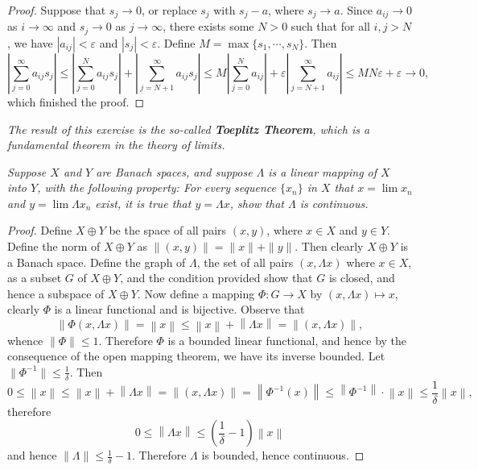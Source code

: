 \begin{proof}
Suppose that $s_j\to 0$, or replace $s_j$ with $s_j-a$, where $s_j\to a$. Since $a_{ij}\to 0$ as $i\to\infty$ and $s_j\to 0$ as $j\to\infty$, there exists some $N>0$ such that for all $i,j>N$, we have $|a_{ij}|<\varepsilon$ and $|s_j|<\varepsilon$. Define $M=\max\{s_1,\cdots,s_N\}$. Then 
$$
\left| \sum_{j=0}^{\infty}{a_{ij}s_j} \right|\le \left| \sum_{j=0}^N{a_{ij}s_j} \right|+\left| \sum_{j=N+1}^{\infty}{a_{ij}s_j} \right|\le M\left| \sum_{j=0}^N{a_{ij}} \right|+\varepsilon \left| \sum_{j=N+1}^{\infty}{a_{ij}} \right|\le MN\varepsilon +\varepsilon \rightarrow 0,
$$
which finished the proof.
\end{proof}
\begin{note}\em
The result of this exercise is the so-called \textbf{Toeplitz Theorem}, which is a fundamental theorem in the theory of limits.
\end{note}
\begin{problem}\em
Suppose $X$ and $Y$ are Banach spaces, and suppose $\Lambda$ is a linear mapping of $X$ into $Y$, with the following property: For every sequence $\{x_n\}$ in $X$ that $x=\lim x_n$ and $y=\lim\Lambda x_n$ exist, it is true that $y=\Lambda x$, show that $\Lambda$ is continuous.
\end{problem}
\begin{proof}
Define $X\oplus Y$ be the space of all pairs $(x,y)$, where $x\in X$ and $y\in Y$. Define the norm of $X\oplus Y$ as $\|(x,y)\|=\|x\|+\|y\|$. Then clearly $X\oplus Y$ is a Banach space. Define the graph of $\Lambda$, the set of all pairs $(x,\Lambda x)$ where $x\in X$, as a subset $G$ of $X\oplus Y$, and the condition provided show that $G$ is closed, and hence a subspace of $X\oplus Y$. Now define a mapping $\Phi :G\rightarrow X$ by $\left( x,\Lambda x \right) \mapsto x$, clearly $\Phi$ is a linear functional and is bijective. Observe that 
$$
\left\| \Phi \left( x,\Lambda x \right) \right\| =\left\| x \right\| \le \left\| x \right\| +\left\| \Lambda x \right\| =\left\| \left( x,\Lambda x \right) \right\| ,
$$
whence $\|\Phi\|\le 1$. Therefore $\Phi$ is a bounded linear functional, and hence by the consequence of the open mapping theorem, we have its inverse bounded. Let $\|\Phi^{-1}\|\le\frac{1}{\delta}$. Then 
$$
0\le \left\| x \right\| \le \left\| x \right\| +\left\| \Lambda x \right\| =\left\| \left( x,\Lambda x \right) \right\| =\left\| \Phi ^{-1}\left( x \right) \right\| \le \left\| \Phi ^{-1} \right\| \cdot \left\| x \right\| \le \frac{1}{\delta}\left\| x \right\| ,
$$
therefore 
$$
0\le \left\| \Lambda x \right\| \le \left( \frac{1}{\delta}-1 \right) \left\| x \right\| 
$$
and hence $\|\Lambda\|\le\frac{1}{\delta}-1$. Therefore $\Lambda$ is bounded, hence continuous.
\end{proof}
